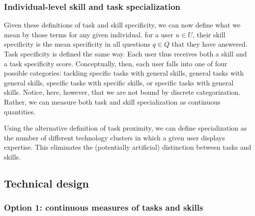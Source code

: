 \documentclass[11pt]{article}
\begin{document}
\subsubsection{Individual-level skill and task specialization}
\label{sec:indiv-level-skill}

Given these definitions of task and skill specificity, we can now
define what we mean by those terms for any given individual. for a
user $u \in U$, their skill specificity is the mean specificity in all
questions $q \in Q$ that they have answered. Task specificity is
defined the same way. Each user thus receives both a skill and a task
specificity score. Conceptually, then, each user falls into one of
four possible categories: tackling specific tasks with general skills,
general tasks with general skills, specific tasks with specific
skills, or specific tasks with general skills. Notice, here, however,
that we are not bound by discrete categorization. Rather, we can
measure both task and skill specialization as continuous quantities.

Using the alternative definition of task proximity, we can define
specialization as the number of different technology clusters in which
a given user displays expertise. This eliminates the (potentially
artificial) distinction between tasks and skills.

\subsection{Technical design}
\label{sec:technical-design}

\subsubsection{Option 1: continuous measures of tasks and skills}
\label{sec:option-1:-continuous}
\end{document}
